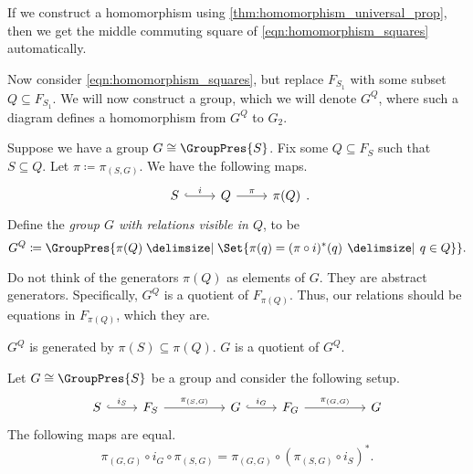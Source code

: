 \begin{remark}
	If we construct a homomorphism using \cref{thm:homomorphism_universal_prop}, then we get the middle commuting square of \eqref{eqn:homomorphism_squares} automatically.
	\label{rmk:universal_prop_homomorphism_gives_squares}
\end{remark}

Now consider \eqref{eqn:homomorphism_squares}, but replace $F_{S_1}$ with some subset $Q \subseteq F_{S_1}$. We will now construct a group, which we will denote $G^Q$, where such a diagram defines a homomorphism from $G^Q$ to $G_2$.

\begin{definition}
	 Suppose we have a group $G \cong \GroupPres{S}$.
	 Fix some $Q \subseteq F_S$ such that $S \subseteq Q$.
	 Let $\pi \coloneq \pi_{(S,G)}$.
	 We have the following maps.
	 \[
	 \begin{tikzcd}
		 S \ar[r, hook, "i"] & Q \ar[r, "\pi"] & \pi(Q)
	 \end{tikzcd}
	 .\]
	 Define the \emph{group $G$ with relations visible in $Q$}, to be  
	 \[
		 G^Q \coloneqq \GroupPres{\pi(Q) \relations \Set{\pi(q) = (\pi \circ i)^*(q) \given q \in Q} }
	 .\]
	 \label{def:G_Q}
\end{definition}

\begin{remark}
	Do not think of  the generators $\pi(Q)$ as elements of $G$.
	They are abstract generators.
	Specifically,  $G^Q$ is a quotient of  $F_{\pi(Q)}$.
	Thus, our relations should be equations in $F_{\pi(Q)}$, which they are.
\end{remark}

\begin{remark}
	$G^Q$ is generated by $\pi(S) \subseteq \pi(Q)$.
	$G$ is a quotient of  $G^Q$.
\end{remark}

\begin{lemma}
	Let $G \cong \GroupPres{S}$ be a group and consider the following setup.
	\[
	\begin{tikzcd}
		S \ar[r, hook, "i_S"] & F_S \ar[rr, "\pi_{(S,G)}"] & & G \ar[r, hook, "i_G"] & F_G \ar[rr, "\pi_{(G,G)}"] & & G
	\end{tikzcd}
	\]
	The following maps are equal.
	\[
		\pi_{(G,G)} \circ i_G \circ \pi_{(S,G)} = \pi_{(G,G)} \circ (\pi_{(S,G)} \circ i_S)^*
	.\]
	\label{lem:group_projections}
\end{lemma}

